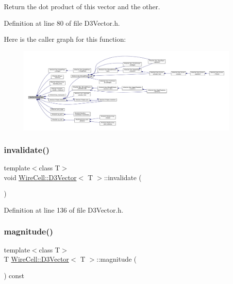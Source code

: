 Return the dot product of this vector and the other. 



Definition at line 80 of file D3\+Vector.\+h.

Here is the caller graph for this function\+:
\nopagebreak
\begin{figure}[H]
\begin{center}
\leavevmode
\includegraphics[width=350pt]{class_wire_cell_1_1_d3_vector_ad116deec8357b27dcad6be127c209490_icgraph}
\end{center}
\end{figure}
\mbox{\label{class_wire_cell_1_1_d3_vector_a19020cb989bd6b3b8d8948db885f5811}} 
\subsubsection{\texorpdfstring{invalidate()}{invalidate()}}
{\footnotesize\ttfamily template$<$class T$>$ \\
void \hyperlink{class_wire_cell_1_1_d3_vector}{Wire\+Cell\+::\+D3\+Vector}$<$ T $>$\+::invalidate (\begin{DoxyParamCaption}{ }\end{DoxyParamCaption})\hspace{0.3cm}{\ttfamily [inline]}}



Definition at line 136 of file D3\+Vector.\+h.

\mbox{\label{class_wire_cell_1_1_d3_vector_aa05f4bdb8795cfa6565042177b5567cd}} 
\subsubsection{\texorpdfstring{magnitude()}{magnitude()}}
{\footnotesize\ttfamily template$<$class T$>$ \\
T \hyperlink{class_wire_cell_1_1_d3_vector}{Wire\+Cell\+::\+D3\+Vector}$<$ T $>$\+::magnitude (\begin{DoxyParamCaption}{ }\end{DoxyParamCaption}) const\hspace{0.3cm}{\ttfamily [inline]}}



